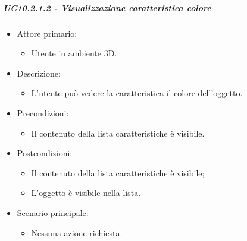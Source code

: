 \subparagraph{UC10.2.1.2 - Visualizzazione caratteristica colore}
\begin{itemize}

	\item Attore primario: 
	\begin{itemize}
		\item Utente in ambiente 3D.
	\end{itemize}
	\item Descrizione:
	\begin{itemize}
		\item L'utente può vedere la caratteristica il colore dell'oggetto.
	\end{itemize}
	
	\item Precondizioni:
	\begin{itemize}
		\item Il contenuto della lista caratteristiche è visibile.
	\end{itemize}
	
	\item Postcondizioni:
	\begin{itemize}
		\item Il contenuto della lista caratteristiche è visibile;
		\item L'oggetto è visibile nella lista.
	\end{itemize}
	
	\item Scenario principale:
	\begin{itemize}
		\item Nessuna azione richiesta.
	\end{itemize}
	
\end{itemize}

